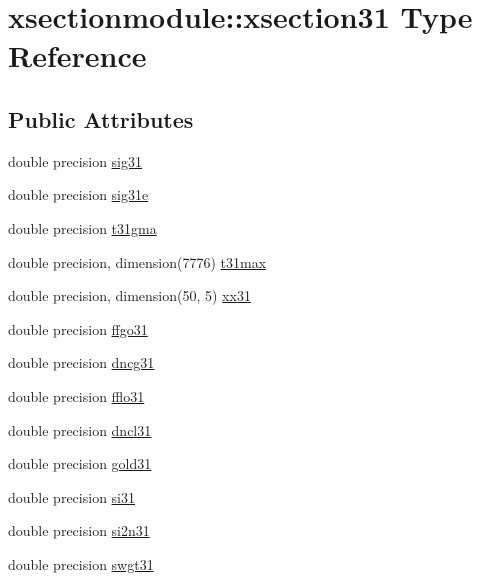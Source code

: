 \hypertarget{structxsectionmodule_1_1xsection31}{}\section{xsectionmodule\+:\+:xsection31 Type Reference}
\label{structxsectionmodule_1_1xsection31}
\subsection*{Public Attributes}
\begin{DoxyCompactItemize}
\item 
double precision \hyperlink{structxsectionmodule_1_1xsection31_ad8ad217d06b089dfea2f9f919edac0a9}{sig31}
\item 
double precision \hyperlink{structxsectionmodule_1_1xsection31_af1fbd0120ed488772c7b1efcd2920716}{sig31e}
\item 
double precision \hyperlink{structxsectionmodule_1_1xsection31_a941129ef041f7913ed731d05a706db9c}{t31gma}
\item 
double precision, dimension(7776) \hyperlink{structxsectionmodule_1_1xsection31_ac450cf5a34c9f2e3d9444c845c0e2e4b}{t31max}
\item 
double precision, dimension(50, 5) \hyperlink{structxsectionmodule_1_1xsection31_ae89e910b7c7a0c2cc7286d25fb702d31}{xx31}
\item 
double precision \hyperlink{structxsectionmodule_1_1xsection31_acf4d4fc067f007cd4915882604c24811}{ffgo31}
\item 
double precision \hyperlink{structxsectionmodule_1_1xsection31_a9b38a6dd13db59421dcb2086a12fb73e}{dncg31}
\item 
double precision \hyperlink{structxsectionmodule_1_1xsection31_a82129aeb38df34f5065d2fedd36f6a0a}{fflo31}
\item 
double precision \hyperlink{structxsectionmodule_1_1xsection31_a23239b98dae72f3964278e90373d3016}{dncl31}
\item 
double precision \hyperlink{structxsectionmodule_1_1xsection31_a1268b179fd278d31df791ade5af83cf2}{gold31}
\item 
double precision \hyperlink{structxsectionmodule_1_1xsection31_a71889713c4b1f5f8c94c9d93c0c8ef67}{si31}
\item 
double precision \hyperlink{structxsectionmodule_1_1xsection31_a2ae69aa4e775bdade468a7ba018e5f77}{si2n31}
\item 
double precision \hyperlink{structxsectionmodule_1_1xsection31_a093f36d89274ab41adb5df14f84174f0}{swgt31}

\end{DoxyCompactItemize}
